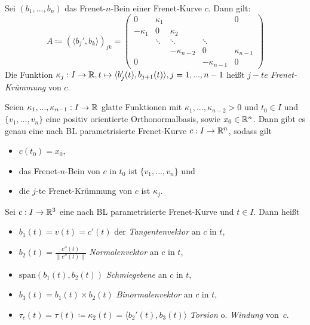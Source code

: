 \documentclass{cheat-sheet}
\newcommand{\Span}{\mathrm{span}}
\begin{document}
\begin{definition}
  Sei $(b_1, ..., b_n)$ das Frenet-$n$-Bein einer Frenet-Kurve $c$. Dann gilt:
  \[ A \coloneqq (\langle b_j' , b_k \rangle)_{jk} = \begin{pmatrix}
    0 & \kappa_1 &&& 0 \\
    - \kappa_1 & 0 & \kappa_2 \\
    & \ddots & \ddots & \ddots \\
    && - \kappa_{n-2} & 0 & \kappa_{n-1} \\
    0 &&& - \kappa_{n-1} & 0
  \end{pmatrix} \]
  Die Funktion $\kappa_j : I \to \mathbb{R}, t \mapsto \langle b_j'(t) , b_{j+1}(t) \rangle, j = 1, ..., n - 1$ heißt $j-te$ \emph{Frenet-Krümmung} von $c$.
\end{definition}


\begin{satz}
  Seien $\kappa_1, ..., \kappa_{n-1} : I \to \mathbb{R}$ glatte Funktionen mit $\kappa_1, ..., \kappa_{n-2} > 0$ und $t_0 \in I$ und $\{ v_1, ..., v_n \}$ eine positiv orientierte Orthonormalbasis, sowie $x_0 \in \mathbb{R}^n$. Dann gibt es genau eine nach BL parametrisierte Frenet-Kurve $c : I \to \mathbb{R}^n$, sodass gilt
  \begin{itemize}
    \item $c(t_0) = x_0$,
    \item das Frenet-$n$-Bein von $c$ in $t_0$ ist $\{ v_1, ..., v_n \}$ und
    \item die $j$-te Frenet-Krümmung von $c$ ist $\kappa_j$.
  \end{itemize}
\end{satz}

\begin{definition}
  Sei $c : I \to \mathbb{R}^3$ eine nach BL parametrisierte Frenet-Kurve und $t \in I$. Dann heißt
  \begin{itemize}
    \item $b_1(t) = v(t) = c'(t)$ der \emph{Tangentenvektor} an $c$ in $t$,
    \item $b_2(t) = \tfrac{c''(t)}{\| c''(t) \|}$ \emph{Normalenvektor} an $c$ in $t$,
    \item $\Span(b_1(t), b_2(t))$ \emph{Schmiegebene} an $c$ in $t$,
    \item $b_3(t) = b_1(t) \times b_2(t)$ \emph{Binormalenvektor} an $c$ in $t$,
    \item $\tau_c(t) = \tau(t) \coloneqq \kappa_2(t) = \langle b_2'(t) , b_3(t) \rangle$ \emph{Torsion} o. \emph{Windung} von~$c$.
  \end{itemize}
\end{definition}
\end{document}
